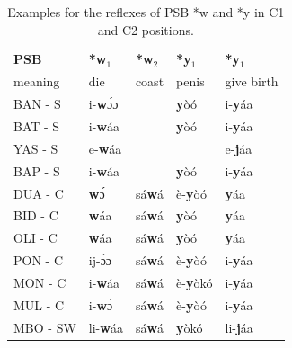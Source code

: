 \documentclass[output=paper,colorlinks,citecolor=brown
]{langscibook}
\begin{document}
\begin{table}
\caption{Examples for the reflexes of PSB *w and *y in C1 and C2 positions.}
\label{tab:grollemundbrownrule:approximantexamples}
 \begin{tabular}{lllll}
  \lsptoprule
\textbf{PSB}              & \textbf{*w$_1$}          & \textbf{*w$_2$}            & \textbf{*y$_1$}            & \textbf{*y$_1$}                 \\
 {{meaning}} & {{die}} & {{coast}} & {{penis}} & {{give birth}} \\
\midrule
BAN - S                   & i-\textbf{w}ɔ́ɔ                &                         & \textbf{y}òó                   & i-\textbf{y}áa                        \\
BAT - S                   & i-\textbf{w}áa                &                         & \textbf{y}òó                   & i-\textbf{y}áa                        \\
YAS - S                   & e-\textbf{w}áa                &                         &                         & e-\textbf{j}áa                        \\
BAP - S                   & i-\textbf{w}áa                &                         & \textbf{y}òó                   & i-\textbf{y}áa                        \\
DUA - C                   & \textbf{w}ɔ́                   & sá\textbf{w}á                  & è-\textbf{y}òó                & \textbf{y}áa                          \\
BID - C                   & \textbf{w}áa                  & sá\textbf{w}á                  & \textbf{y}òó                   & \textbf{y}áa                          \\
OLI - C                   & \textbf{w}áa                  & sá\textbf{w}á                  & \textbf{y}òó                   & \textbf{y}áa                          \\
PON - C                   & ij-ɔ́ɔ                & sá\textbf{w}á                  & è-\textbf{y}òó                & i-\textbf{y}áa                        \\
MON - C                   & i-\textbf{w}áa                & sá\textbf{w}á                  & è-\textbf{y}òkó               & i-\textbf{y}áa                        \\
MUL - C                   & i-\textbf{w}ɔ́                 & sá\textbf{w}á                  & è-\textbf{y}òó                & i-\textbf{y}áa                        \\
MBO - SW                  & li-\textbf{w}áa               & sá\textbf{w}á                  & \textbf{y}òkó                  & li-\textbf{j}áa                       \\

\end{tabular}
\end{table}
\end{document}
